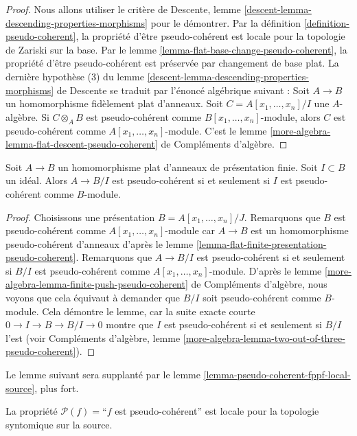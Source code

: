 \begin{proof}
Nous allons utiliser le critère de
Descente, lemme \ref{descent-lemma-descending-properties-morphisms}
pour le démontrer. Par
la définition \ref{definition-pseudo-coherent},
la propriété d'être pseudo-cohérent est locale pour la topologie de Zariski sur la base. Par
le lemme \ref{lemma-flat-base-change-pseudo-coherent},
la propriété d'être pseudo-cohérent est préservée par changement de base plat.
La dernière hypothèse (3) du
lemme \ref{descent-lemma-descending-properties-morphisms} de Descente
se traduit par l'énoncé algébrique suivant :
Soit $A \to B$ un homomorphisme fidèlement plat d'anneaux.
Soit $C = A[x_1, \ldots, x_n]/I$ une $A$-algèbre.
Si $C \otimes_A B$ est pseudo-cohérent comme $B[x_1, \ldots, x_n]$-module,
alors $C$ est pseudo-cohérent comme $A[x_1, \ldots, x_n]$-module.
C'est le
lemme \ref{more-algebra-lemma-flat-descent-pseudo-coherent} de Compléments d'algèbre.
\end{proof}

\begin{lemma}
\label{lemma-quotient-of-flat-finitely-presented}
Soit $A \to B$ un homomorphisme plat d'anneaux de présentation finie.
Soit $I \subset B$ un idéal. Alors $A \to B/I$ est pseudo-cohérent
si et seulement si $I$ est pseudo-cohérent comme $B$-module.
\end{lemma}

\begin{proof}
Choisissons une présentation $B = A[x_1, \ldots, x_n]/J$.
Remarquons que $B$ est pseudo-cohérent comme $A[x_1, \ldots, x_n]$-module
car $A \to B$ est un homomorphisme pseudo-cohérent d'anneaux d'après le
lemme \ref{lemma-flat-finite-presentation-pseudo-coherent}.
Remarquons que $A \to B/I$ est pseudo-cohérent si et seulement si
$B/I$ est pseudo-cohérent comme $A[x_1, \ldots, x_n]$-module. D'après le
lemme \ref{more-algebra-lemma-finite-push-pseudo-coherent} de Compléments d'algèbre,
nous voyons que cela équivaut à demander que $B/I$ soit
pseudo-cohérent comme $B$-module. Cela démontre le lemme, car la
suite exacte courte $0 \to I \to B \to B/I \to 0$
montre que $I$ est pseudo-cohérent si et seulement si $B/I$ l'est (voir
Compléments d'algèbre,
lemme \ref{more-algebra-lemma-two-out-of-three-pseudo-coherent}).
\end{proof}

\noindent
Le lemme suivant sera supplanté par le
lemme \ref{lemma-pseudo-coherent-fppf-local-source}, plus fort.

\begin{lemma}
\label{lemma-pseudo-coherent-syntomic-local-source}
La propriété $\mathcal{P}(f) =$``$f$ est pseudo-cohérent''
est locale pour la topologie syntomique sur la source.
\end{lemma}


